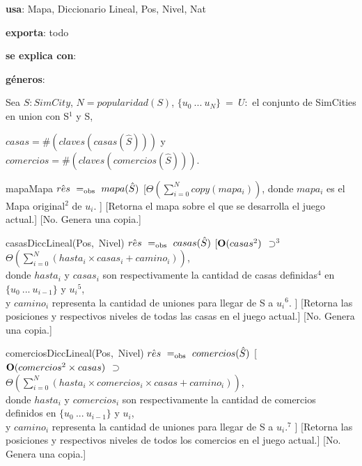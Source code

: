 \begin{Interfaz}
    \textbf{usa}: Mapa, Diccionario Lineal, Pos, Nivel, Nat 
    
    \textbf{exporta}: todo

    \textbf{se explica con}: 
  
    \textbf{géneros}: 
    
    
    Sea $S: SimCity$, $N = popularidad(S)$, $\{u_0\ ...\ u_{N}\}\ =\ U:$ el conjunto de SimCities en union con S$^{1}$ y S, 

    $casas = \#(claves(casas(\hat{S})))$ y $comercios = \#(claves(comercios(\hat{S})))$.

    \vspace{4mm}
    \InterfazFuncion
    {mapa}{}{Mapa}
    {$\hat{res}\ =_{\mathrm{obs}}\ mapa(\hat{S})$}
    [$\Theta(\sum_{i = 0}^{N}{copy(mapa_i)})$,
        donde $mapa_i$ es el Mapa original$^{2}$ de $u_i$.
    ]
    [Retorna el mapa sobre el que se desarrolla el juego actual.]
    [No. Genera una copia.]

    \vspace{4mm}
    \InterfazFuncion
    {casas}{}{DiccLineal(Pos,\ Nivel)}
    {$\hat{res}\ =_{\mathrm{obs}}\ casas(\hat{S})$}
    [$\bold{O}(casas^{2})$ $\supset^{3}$ $\Theta(\sum_{i = 0}^{N}{(hasta_i \times casas_i + camino_i)})$, \\ \tab 
        donde $hasta_i$ y $casas_i$ son respectivamente la cantidad de casas definidas$^{4}$ en $\{u_0\ ...\ u_{i - 1}\}$ y $u_i$$^{5}$, \\
        \tab y $camino_i$ representa la cantidad de uniones para llegar de S a $u_i$$^{6}$.
    ]
    [Retorna las posiciones y respectivos niveles de todas las casas en el juego actual.]
    [No. Genera una copia.]

    \vspace{4mm}
    \InterfazFuncion
    {comercios}{}{DiccLineal(Pos,\ Nivel)}
    {$\hat{res}\ \igobs\ comercios(\hat{S})$}
    [$\bold{O}(comercios^{2} \times casas)$ $\supset$ $\Theta(\sum_{i = 0}^{N}{(hasta_i \times comercios_i \times casas + camino_i)})$,\\ \tab
        donde $hasta_i$ y $comercios_i$ son respectivamente la cantidad de comercios definidos en $\{u_0\ ...\ u_{i - 1}\}$ y $u_i$, 
        \\ \tab y $camino_i$ representa la cantidad de uniones para llegar de S a $u_i$.$^{7}$ 
    ]
    [Retorna las posiciones y respectivos niveles de todos los comercios en el juego actual.]
    [No. Genera una copia.]


\end{Interfaz}
